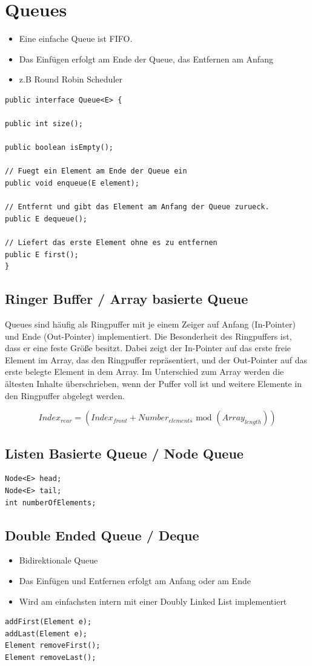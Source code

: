 \section{Queues}
\begin{itemize}
	\item Eine einfache Queue ist FIFO. 
	\item Das Einfügen erfolgt am Ende der Queue, das Entfernen am Anfang
	\item z.B Round Robin Scheduler
\end{itemize}

\begin{lstlisting}
public interface Queue<E> {

public int size();

public boolean isEmpty();

// Fuegt ein Element am Ende der Queue ein
public void enqueue(E element);

// Entfernt und gibt das Element am Anfang der Queue zurueck.
public E dequeue();

// Liefert das erste Element ohne es zu entfernen
public E first();
}
\end{lstlisting}

\subsection{Ringer Buffer / Array basierte Queue}
Queues sind häufig als Ringpuffer mit je einem Zeiger auf Anfang (In-Pointer) und Ende (Out-Pointer) implementiert. Die Besonderheit des Ringpuffers ist, dass er eine feste Größe besitzt. Dabei zeigt der In-Pointer auf das erste freie Element im Array, das den Ringpuffer repräsentiert, und der Out-Pointer auf das erste belegte Element in dem Array. Im Unterschied zum Array werden die ältesten Inhalte überschrieben, wenn der Puffer voll ist und weitere Elemente in den Ringpuffer abgelegt werden.


\[
Index_{rear} = (Index_{front} + Number_{elements} \text{ mod }(Array_{length})) 	
\]

\subsection{Listen Basierte Queue / Node Queue}
\begin{lstlisting}
Node<E> head;
Node<E> tail;
int numberOfElements;
\end{lstlisting}

\subsection{Double Ended Queue / Deque}
\begin{itemize}
	\item Bidirektionale Queue
	\item Das Einfügen und Entfernen erfolgt am Anfang oder am Ende
	\item Wird am einfachsten intern mit einer Doubly Linked List implementiert
\end{itemize}
\begin{lstlisting}
addFirst(Element e); 
addLast(Element e);
Element removeFirst(); 
Element removeLast();
\end{lstlisting}

